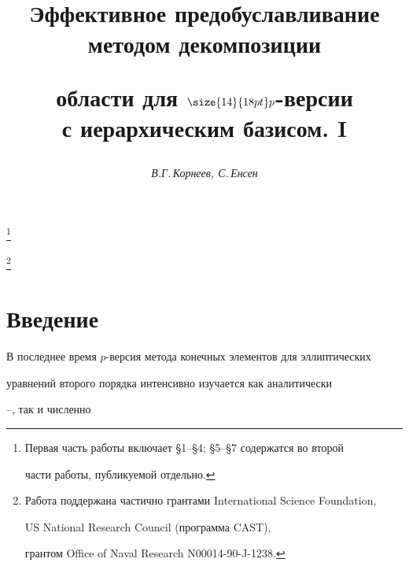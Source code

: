 






\author{\it В.Г.\,Корнеев, С.\,Енсен}




\title{Эффективное предобуславливание методом декомпозиции


области для ${\size{14}{18pt}\selectfont p}$-версии\\


с иерархическим базисом. I}


\thanks{Первая часть работы включает \S1--\S4; \S5--\S7 содержатся во второй


части работы, публикуемой отдельно.}


\thanks{Работа поддержана частично грантами International Science Foundation,


US National Research Council (программа CAST),


грантом Office of Naval Research N00014-90-J-1238.}





\date{}




\pagestyle{plain} %







\maketitle


\label{begin}





\section*{Введение}





В последнее время $p$-версия метода конечных элементов для эллиптических


уравнений второго порядка интенсивно изучается как аналитически


\cite{ba-cr-ma-pi}--\cite{pavarino2}, так и численно


